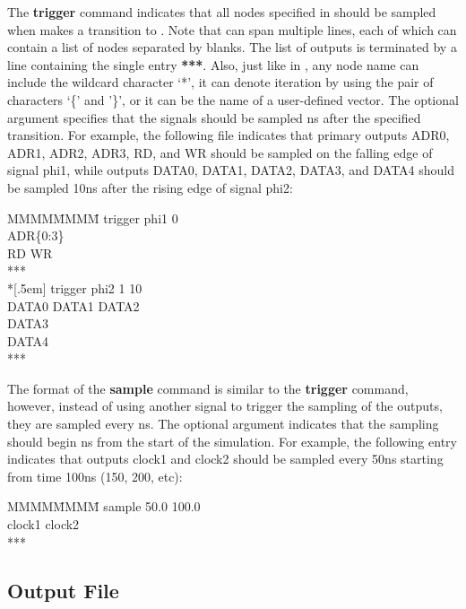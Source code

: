 The {\bf trigger} command indicates that all nodes specified in
 should be sampled when  makes a transition to
.  Note that  can span multiple
lines, each of which can contain a list of nodes separated by blanks.  The
list of outputs is terminated by a line containing the single entry {\bf
***}.  Also, just like in \irsim, any node name can include the wildcard
character `*', it can denote iteration by using the pair of characters `\{'
and '\}', or it can be the name of a user-defined vector.  The optional
argument  specifies that the signals should be sampled
 ns after the specified transition.  For example, the following
file indicates that primary outputs ADR0, ADR1, ADR2, ADR3, RD, and WR
should be sampled on the falling edge of signal phi1, while outputs DATA0,
DATA1, DATA2, DATA3, and DATA4 should be sampled 10ns after the rising edge
of signal phi2:

\begin{tabbing}
MMMM\=MMMM\= \kill
\>trigger phi1 0 \\
\>\>ADR\{0:3\} \\
\>\>RD WR \\
\>*** \\*[.5em]
\>trigger phi2 1 10 \\
\>\>DATA0 DATA1 DATA2 \\
\>\>DATA3 \\
\>\>DATA4 \\
\>*** \\
\end{tabbing}

The format of the {\bf sample} command is similar to the {\bf trigger}
command, however, instead of using another signal to trigger the sampling of
the outputs, they are sampled every  ns.  The optional
 argument indicates that the sampling should begin 
ns from the start of the simulation.  For example, the following entry
indicates that outputs clock1 and clock2 should be sampled every 50ns
starting from time 100ns (150, 200, etc):

\begin{tabbing}
MMMM\=MMMM\= \kill
\>sample 50.0 100.0 \\
\>\> clock1 clock2 \\
\>*** \\
\end{tabbing}

\clearpage

\subsection{Output File}

